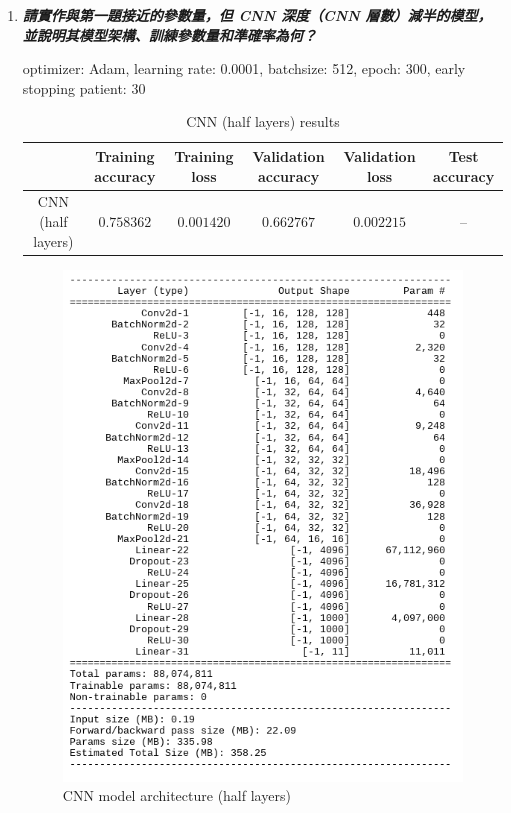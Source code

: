 \documentclass[a4paper,11pt]{article}
\begin{document}
\begin{enumerate}
	\item \textit{\textbf{請實作與第一題接近的參數量，但 CNN 深度（CNN 層數）減半的模型，並說明其模型架構、訓練參數量和準確率為何？}}

	optimizer: Adam, learning rate: 0.0001, batchsize: 512, epoch: 300, early stopping patient: 30\\

		\begin{table}[htp]
			\begin{center}
				\begin{tabular}{ | c | c | c | c | c | c |}
				  	\hline
			  		& Training accuracy & Training loss & Validation accuracy & Validation loss & Test accuracy\\[0.5ex] 
			  		\hline \hline
			  		CNN (half layers) & $0.758362$ & $0.001420$ & $0.662767$ & $0.002215$ & --\\[0.2ex]
			  		\hline
				\end{tabular}
				\caption{CNN (half layers) results}
			\end{center}
		\end{table}

		\begin{figure}[htp]
		    \begin{center}
		    		\includegraphics[scale=0.6]{./half_cnn_architecture.png}
		    	\caption{CNN model architecture (half layers)}
		    \end{center}
		\end{figure}


\end{enumerate}
\end{document}
